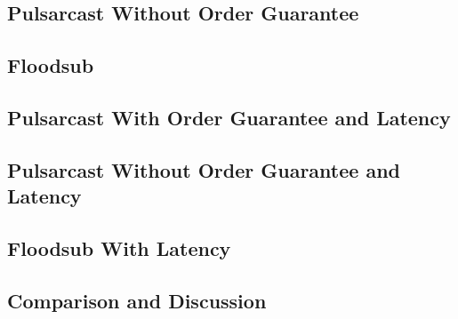 \subsection{Pulsarcast Without Order Guarantee}\label{subsec:pulsarcast-without-order-guarantee}

\subsection{Floodsub}\label{subsec:floodsub}

\subsection{Pulsarcast With Order Guarantee and Latency}\label{subsec:pulsarcast-with-order-guarantee-and-latency}

\subsection{Pulsarcast Without Order Guarantee and Latency}\label{subsec:pulsarcast-without-order-guarantee-and-latency}

\subsection{Floodsub With Latency}\label{subsec:floodsub-with-latency}

\subsection{Comparison and Discussion}\label{subsec:comparison}
